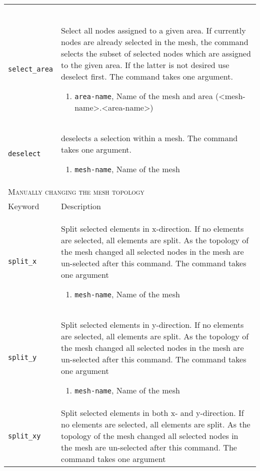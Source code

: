 \documentclass[noshowpacs,preprintnumbers,amsmath,amssymb, letter]{revtex4}
\begin{document}
\begin{longtable}{p{}p{}}
\begin{enumerate}
\end{enumerate}\\
\texttt{select\_area}	& Select all nodes assigned to a given area. If currently nodes are already selected in the mesh, the command selects the subset of selected nodes which are assigned to the given area. If the latter is not desired use deselect first. The command takes one argument.
\begin{enumerate}
\item \texttt{area-name}, Name of the mesh and area (\textless mesh-name\textgreater .\textless area-name\textgreater )
\end{enumerate}\\
\texttt{deselect}	& deselects a selection within a mesh. The command takes one argument.
\begin{enumerate}
\item \texttt{mesh-name}, Name of the mesh
\end{enumerate}\\
\multicolumn{2}{l}{\textsc{Manually changing the mesh topology}} \\*
\hline
Keyword & Description \\
\texttt{split\_x}	& Split selected elements in x-direction. If no elements are selected, all elements are split. As the topology of the mesh changed all selected nodes in the mesh are un-selected after this command. The command takes one argument 
\begin{enumerate}
\item \texttt{mesh-name}, Name of the mesh
\end{enumerate}\\
\texttt{split\_y}	& Split selected elements in y-direction. If no elements are selected, all elements are split. As the topology of the mesh changed all selected nodes in the mesh are un-selected after this command. The command takes one argument 
\begin{enumerate}
\item \texttt{mesh-name}, Name of the mesh
\end{enumerate}\\
\texttt{split\_xy}	& Split selected elements in both x- and y-direction. If no elements are selected, all elements are split. As the topology of the mesh changed all selected nodes in the mesh are un-selected after this command. The command takes one argument 

\end{longtable}
\end{document}
